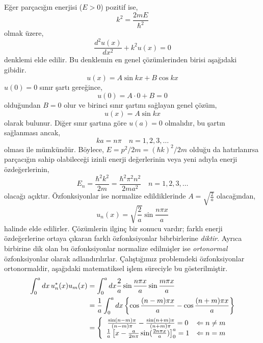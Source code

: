 \documentclass[00_kitap.tex]{subfiles}
\begin{document}
Eğer parçacığın enerjisi ($E>0$) pozitif ise,
\begin{equation}
k ^ { 2 } = \frac { 2 m E } { \hbar ^ { 2 } }
\end{equation}
olmak üzere,
\begin{equation}
\frac { d ^ { 2 } u ( x ) } { d x ^ { 2 } } + k ^ { 2 } u ( x ) = 0
\end{equation}
denklemi elde edilir. Bu denklemin en genel çözümlerinden birisi aşağıdaki gibidir.
\begin{equation}
u(x) = A \sin k x + B \cos k x
\end{equation}
$u(0)=0$ sınır şartı gereğince,
\begin{equation*}
u(0) = A\cdot 0 + B = 0
\end{equation*}
olduğundan $B=0$ olur ve birinci sınır şartını sağlayan genel çözüm,
\begin{equation}
u(x) = A \sin k x
\end{equation}
olarak bulunur. Diğer sınır şartına göre $u(a)=0$ olmalıdır, bu şartın sağlanması ancak,
\begin{equation}
k a = n \pi \quad n = 1,2,3 , \ldots
\end{equation}
olması ile mümkündür. Böylece, $E = p^2/2m = (\hbar k)^2/2m$ olduğu da hatırlanırsa parçacığın sahip olabileceği izinli enerji değerlerinin veya yeni adıyla enerji özdeğerlerinin,
\begin{equation}
E _ { n } = \frac { \hbar ^ { 2 } k ^ { 2 } } { 2 m } = \frac { \hbar ^ { 2 } \pi ^ { 2 } n ^ { 2 } } { 2 m a ^ { 2 } } \quad n = 1,2,3 , \ldots
\end{equation}
olacağı açıktır. Özfonksiyonlar ise normalize edildiklerinde $A=\sqrt { \frac { 2 } { a } }$ olacağından,
\begin{equation}
u _ { n } ( x ) = \sqrt { \frac { 2 } { a } } \sin \frac { n \pi x } { a }
\end{equation}
halinde elde edilirler. Çözümlerin ilginç bir sonucu vardır; farklı enerji özdeğerlerine ortaya çıkaran farklı özfonksiyonlar bibrbirlerine \emph{diktir}. Ayrıca birbirine dik olan bu özfonksiyonlar normalize edilmişler ise \emph{ortonormal} özfonksiyonlar olarak adlandırılırlar. Çalıştığımız problemdeki özfonksiyonlar ortonormaldir, aşağıdaki matematiksel işlem süreciyle bu gösterilmiştir.
\begin{align} 
	\int _ { 0 } ^ { a } d x \, u _ { n } ^ { * } ( x ) u _ { m } ( x ) 
	& = \int _ { 0 } ^ { a } d x \frac { 2 } { a } \sin \frac { n \pi x } { a } \sin \frac { m \pi x } { a } \nonumber\\ 
	& = \frac { 1 } { a } \int _ { 0 } ^ { a } d x \left\{ \cos \frac { ( n - m ) \pi x } { a } - \cos \frac { ( n + m ) \pi x } { a } \right\} \nonumber\\ 
&=\left\{
\begin{array} { c l }
{ \frac { \sin ( n - m ) \pi } { ( n - m ) \pi } - \frac { \sin ( n + m ) \pi } { ( n + m ) \pi } = 0 } & { \Leftarrow n \neq m } \\ 
{\frac{1}{a}\left[x-\frac{a}{2 n \pi}\sin(\frac{2n\pi x}{a})\right]_0^a = 1 } & { \Leftarrow n = m} 
\end{array} 
\right.
\end{align}
\end{document}
